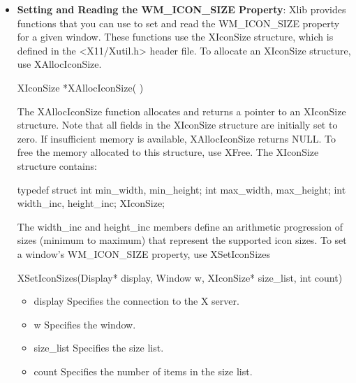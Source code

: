 \documentclass{report}
\begin{document}
\begin{itemize}
\begin{itemize}
            \bigbreak \noindent 
            XGetWMColormapWindows can generate a BadWindow error.
        \item \textbf{Setting and Reading the WM\_ICON\_SIZE Property}: Xlib provides functions that you can use to set and read the WM_ICON_SIZE property for a given window. These functions use the XIconSize structure, which is defined in the <X11/Xutil.h> header file.
            \bigbreak \noindent 
            To allocate an XIconSize structure, use XAllocIconSize.
            \bigbreak \noindent 
            \begin{cppcode}
            XIconSize *XAllocIconSize( )
            \end{cppcode}
            \bigbreak \noindent 
            The XAllocIconSize function allocates and returns a pointer to an XIconSize structure. Note that all fields in the XIconSize structure are initially set to zero. If insufficient memory is available, XAllocIconSize returns NULL. To free the memory allocated to this structure, use XFree.
            \bigbreak \noindent 
            The XIconSize structure contains:
            \bigbreak \noindent 
            \begin{cppcode}
            typedef struct {
                int min_width, min_height;
                int max_width, max_height;
                int width_inc, height_inc;
            } XIconSize;
            \end{cppcode}
            \bigbreak \noindent 
            The width\_inc and height\_inc members define an arithmetic progression of sizes (minimum to maximum) that represent the supported icon sizes.
            \bigbreak \noindent 
            To set a window’s WM\_ICON\_SIZE property, use XSetIconSizes
            \bigbreak \noindent 
            \begin{cppcode}
                XSetIconSizes(Display* display, Window w, XIconSize* size_list, int count)
            \end{cppcode}
            \bigbreak \noindent
            \begin{itemize}
                \item display Specifies the connection to the X server.
                \item w Specifies the window.
                \item size\_list Specifies the size list.
                \item count Specifies the number of items in the size list.
            \end{itemize}

\end{itemize}
\end{itemize}
\end{document}
